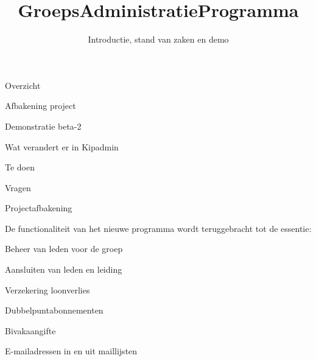 \documentclass[chiro,pdf]{prosper}
\title{GroepsAdministratieProgramma}
\author{Introductie, stand van zaken en demo}
\begin{document}
\maketitle

%
%

{
\begin{slide}{Overzicht}

\begin{itemstep}
\item Afbakening project
\item Demonstratie beta-2
\item Wat verandert er in Kipadmin
\item Te doen 
\item Vragen
\end{itemstep}

\end{slide}
}

%
%

{
\begin{slide}{Projectafbakening}

De functionaliteit van het nieuwe programma wordt teruggebracht tot de essentie:
\begin{itemstep}
\item Beheer van leden voor de groep
\item Aansluiten van leden en leiding
\item Verzekering loonverlies
\item Dubbelpuntabonnementen
\item Bivakaangifte
\item E-mailadressen in en uit maillijsten
\end{itemstep}

\end{slide}
}

%
%
\end{document}
